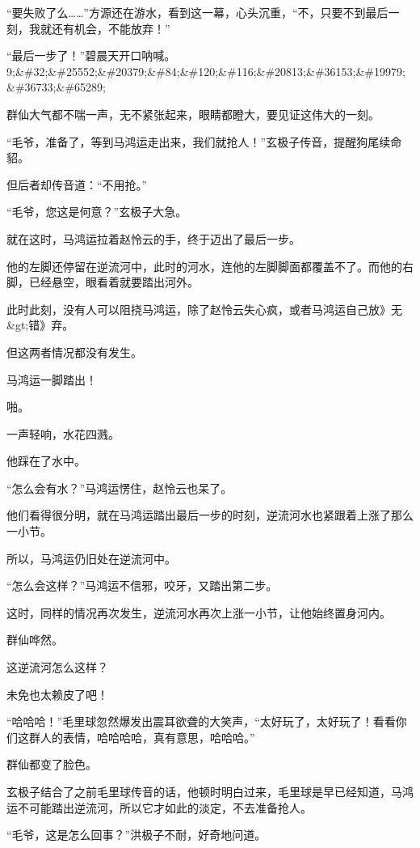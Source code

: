 
\begin{this_body}

“要失败了么……”方源还在游水，看到这一幕，心头沉重，“不，只要不到最后一刻，我就还有机会，不能放弃！”

“最后一步了！”碧晨天开口呐喊。9;\&\#32;\&\#25552;\&\#20379;\&\#84;\&\#120;\&\#116;\&\#20813;\&\#36153;\&\#19979;\&\#36733;\&\#65289;

群仙大气都不喘一声，无不紧张起来，眼睛都瞪大，要见证这伟大的一刻。

“毛爷，准备了，等到马鸿运走出来，我们就抢人！”玄极子传音，提醒狗尾续命貂。

但后者却传音道：“不用抢。”

“毛爷，您这是何意？”玄极子大急。

就在这时，马鸿运拉着赵怜云的手，终于迈出了最后一步。

他的左脚还停留在逆流河中，此时的河水，连他的左脚脚面都覆盖不了。而他的右脚，已经悬空，眼看着就要踏出河外。

此时此刻，没有人可以阻挠马鸿运，除了赵怜云失心疯，或者马鸿运自己放》无\&gt;错》弃。

但这两者情况都没有发生。

马鸿运一脚踏出！

啪。

一声轻响，水花四溅。

他踩在了水中。

“怎么会有水？”马鸿运愣住，赵怜云也呆了。

他们看得很分明，就在马鸿运踏出最后一步的时刻，逆流河水也紧跟着上涨了那么一小节。

所以，马鸿运仍旧处在逆流河中。

“怎么会这样？”马鸿运不信邪，咬牙，又踏出第二步。

这时，同样的情况再次发生，逆流河水再次上涨一小节，让他始终置身河内。

群仙哗然。

这逆流河怎么这样？

未免也太赖皮了吧！

“哈哈哈！”毛里球忽然爆发出震耳欲聋的大笑声，“太好玩了，太好玩了！看看你们这群人的表情，哈哈哈哈，真有意思，哈哈哈。”

群仙都变了脸色。

玄极子结合了之前毛里球传音的话，他顿时明白过来，毛里球是早已经知道，马鸿运不可能踏出逆流河，所以它才如此的淡定，不去准备抢人。

“毛爷，这是怎么回事？”洪极子不耐，好奇地问道。


\end{this_body}
